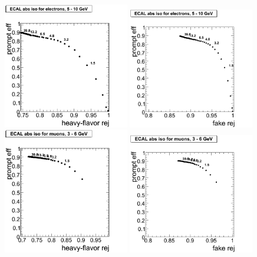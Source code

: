 \documentclass{cmspaper}
\begin{document}
\begin{figure}[htbp]
\begin{center}
   \includegraphics[width = 0.49\textwidth]{pictures/trackCut/bkgdRej_sigEff/elec_nonPrompt_ptCut0_ptCut1.png}
   \includegraphics[width = 0.49\textwidth]{pictures/trackCut/bkgdRej_sigEff/elec_fake_ptCut0_ptCut1.png}
   \includegraphics[width = 0.49\textwidth]{pictures/trackCut/bkgdRej_sigEff/muon_nonPrompt_ptCut0_ptCut1.png}
   \includegraphics[width = 0.49\textwidth]{pictures/trackCut/bkgdRej_sigEff/muon_fake_ptCut0_ptCut1.png}

\end{center}
\end{figure}
\end{document}
